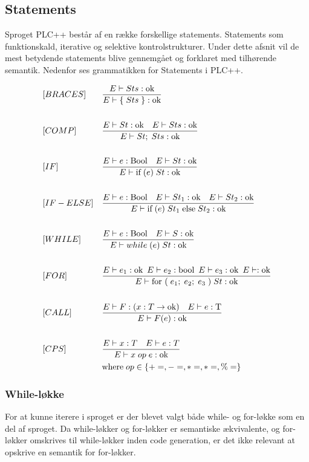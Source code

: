 \noindent \subsection{Statements}
Sproget PLC++ består af en række forskellige statements. Statements som funktionskald, iterative og selektive kontrolstrukturer. Under dette afsnit vil de mest betydende statements blive gennemgået og forklaret med tilhørende semantik. Nedenfor ses grammatikken for Statements i PLC++.

\begin{align*}
&[BRACES] & & \frac{E\vdash Sts : \text{ok}}{E\vdash\{\;Sts\;\} : \text{ok}}\\\\
&[COMP] & &\frac{E \vdash St : \text{ok}\quad E \vdash Sts : \text{ok}}{E \vdash St;\;Sts : \text{ok}}\\\\
&[IF] & &\frac{E \vdash e : \text{Bool}\quad E \vdash St : \text{ok}}{E \vdash \text{if}\; (e)\;  St : \text{ok}}\\\\
&[IF-ELSE] & &\frac{E \vdash e : \text{Bool}\quad E \vdash St_1 : \text{ok}\quad E \vdash St_2 : \text{ok}}{E \vdash \text{if}\; (e)\; St_1\; \text{else} \;St_2 : \text{ok}}\\\\
&[WHILE] & &\frac{E \vdash e : \text{Bool}\quad E \vdash S : \text{ok}}{E \vdash while\; (e)\; St : \text{ok}}\\\\
&[FOR] & &\frac{E \vdash e_1 : \text{ok}\enskip E \vdash e_2 : \text{bool}\enskip E \vdash e_3 : \text{ok}\enskip E \vdash : \text{ok}}{E \vdash \text{for } (\; e_1;\; e_2;\; e_3\;) \; St : \text{ok}}\\\\
&[CALL] & &\frac{E \vdash F : (x : T \rightarrow \text{ok})\quad E \vdash e : \text{T}}{E \vdash F(e) : \text{ok}}\\\\
&[CPS] & &\frac{E \vdash x : T\quad E \vdash e : T}{E \vdash x\; op\; e : \text{ok}}\\
& & &\text{where}\; op \in \{+=, -=, *=, *=, \%=\}
\end{align*}


\subsubsection*{While-løkke}
For at kunne iterere i sproget er der blevet valgt både while- og for-løkke som en del af sproget. Da while-løkker og for-løkker er semantiske ækvivalente, og for-løkker omskrives til while-løkker inden code generation, er det ikke relevant at opskrive en semantik for for-løkker. 

